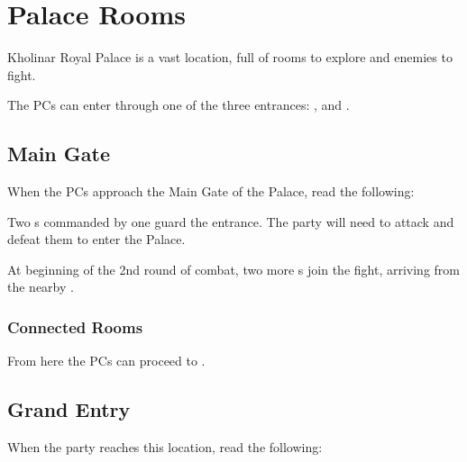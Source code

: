 \section{Palace Rooms}
\label{sec:kholinarPalaceRooms}

Kholinar Royal Palace is a vast location, full of rooms to explore and enemies to fight. 

The PCs can enter through one of the three entrances: ,  and .



\subsection{Main Gate}
\label{ssec:kholinarPalaceRoomsMainGate}

When the PCs approach the Main Gate of the Palace, read the following:


Two \enemyQueensGuard{}s commanded by one \enemyQueensGuardLeader{} guard the entrance. The party will need to attack and defeat them to enter the Palace.

At beginning of the 2nd round of combat, two more \enemyQueensGuard{}s join the fight, arriving from the nearby .

\subsubsection{Connected Rooms}

From here the PCs can proceed to .




\subsection{Grand Entry}
\label{ssec:kholinarPalaceRoomGrandEntry}

When the party reaches this location, read the following:


